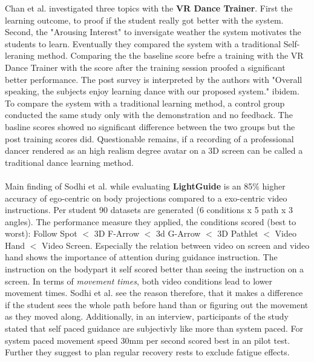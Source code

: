 Chan et al. investigated three topics with the \textbf{VR Dance Trainer}. First the learning outcome, to proof if the student really got better with the system. Second, the "Arousing Interest" to inversigate weather the system motivates the students to learn. Eventually they compared the system with a traditional Self-leraning method. Comparing the the baseline score befre a training with the VR Dance Trainer with the score after the training session proofed a significant better performance. The post survey is interpreted by the authors with "Overall speaking, the subjects enjoy learning dance with our proposed system." ibidem. To compare the system with a traditional learning method, a control group conducted the same study only with the demonstration and no feedback. The basline scores showed no significant difference between the two groups but the post training scores did. Questionable remains, if a recording of a professional dancer rendered as an high realism degree avatar on a 3D screen can be called a traditional dance learning method.\\ \\
Main finding of Sodhi et al. while evaluating \textbf{LightGuide} is an 85\% higher accuracy of ego-centric on body projections compared to a exo-centric video instructions.
Per student 90 datasets are generated (6 conditions x 5 path x 3 angles). The performance measure they applied, the conditions scored (best to worst): Follow Spot $<$ 3D F-Arrow $<$ 3d G-Arrow $<$ 3D Pathlet $<$ Video Hand $<$ Video Screen. Especially the relation between video on screen and video hand shows the importance of attention during guidance instruction. The instruction on the bodypart it self scored better than seeing the instruction on a screen. In terms of \textit{movement times}, both video conditions lead to lower movement times. Sodhi et al. see the reason therefore, that it makes a difference if the student sees the whole path before hand than or figuring out the movement as they moved along. Additionally, in an interview, participants of the study stated that self paced guidance are subjectivly like more than system paced. For system paced movement speed 30mm per second scored best in an pilot test. Further they suggest to plan regular recovery rests to exclude fatigue effects.\\ \\

